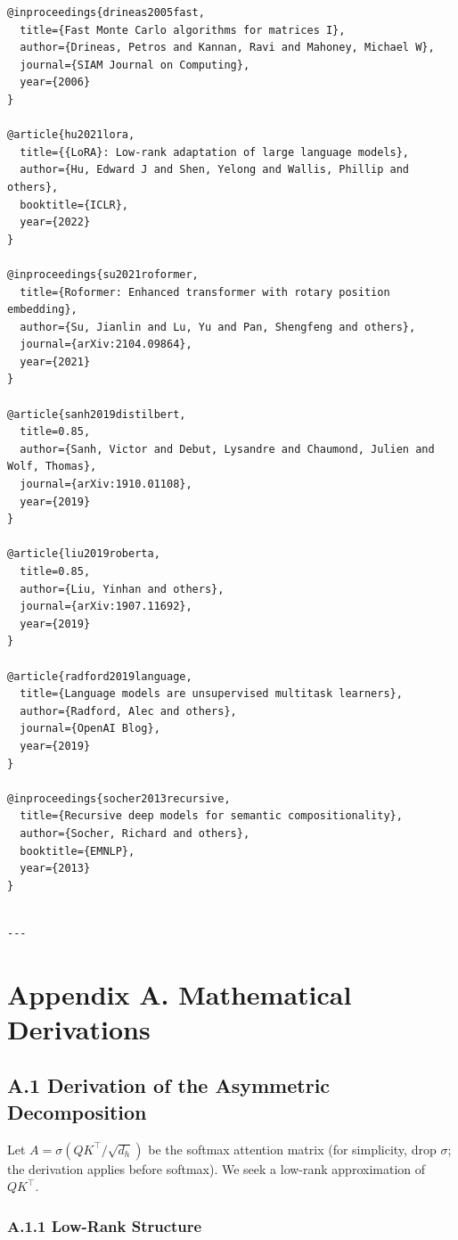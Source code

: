 \begin{lstlisting}
@inproceedings{drineas2005fast,
  title={Fast Monte Carlo algorithms for matrices I},
  author={Drineas, Petros and Kannan, Ravi and Mahoney, Michael W},
  journal={SIAM Journal on Computing},
  year={2006}
}

@article{hu2021lora,
  title={{LoRA}: Low-rank adaptation of large language models},
  author={Hu, Edward J and Shen, Yelong and Wallis, Phillip and others},
  booktitle={ICLR},
  year={2022}
}

@inproceedings{su2021roformer,
  title={Roformer: Enhanced transformer with rotary position embedding},
  author={Su, Jianlin and Lu, Yu and Pan, Shengfeng and others},
  journal={arXiv:2104.09864},
  year={2021}
}

@article{sanh2019distilbert,
  title=0.85,
  author={Sanh, Victor and Debut, Lysandre and Chaumond, Julien and Wolf, Thomas},
  journal={arXiv:1910.01108},
  year={2019}
}

@article{liu2019roberta,
  title=0.85,
  author={Liu, Yinhan and others},
  journal={arXiv:1907.11692},
  year={2019}
}

@article{radford2019language,
  title={Language models are unsupervised multitask learners},
  author={Radford, Alec and others},
  journal={OpenAI Blog},
  year={2019}
}

@inproceedings{socher2013recursive,
  title={Recursive deep models for semantic compositionality},
  author={Socher, Richard and others},
  booktitle={EMNLP},
  year={2013}
}
\end{lstlisting}
\begin{lstlisting}

---
\end{lstlisting}


\section{Appendix A. Mathematical Derivations}

\subsection{A.1 Derivation of the Asymmetric Decomposition}

Let $A = \sigma(Q K^\top / \sqrt{d_h})$ be the softmax attention matrix (for 
simplicity, drop $\sigma$; the derivation applies before softmax). We seek 
a low-rank approximation of $QK^\top$.

\subsubsection{A.1.1 Low-Rank Structure}

